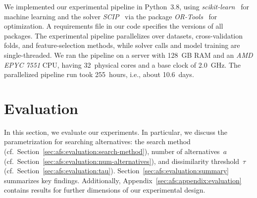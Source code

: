 \documentclass{article}
\theoremstyle{definition}
\begin{document}
We implemented our experimental pipeline in Python~3.8, using \emph{scikit-learn}~\cite{pedregosa2011scikit-learn} for machine learning and the solver \emph{SCIP}~\cite{bestuzheva2021scip} via the package \emph{OR-Tools}~\cite{perron2022or-tools} for optimization.
A requirements file in our code specifies the versions of all packages.
The experimental pipeline parallelizes over datasets, cross-validation folds, and feature-selection methods, while solver calls and model training are single-threaded.
We ran the pipeline on a server with 128~GB RAM and an \emph{AMD EPYC 7551} CPU, having 32~physical cores and a base clock of 2.0~GHz.
The parallelized pipeline run took 255~hours, i.e., about 10.6~days.

\section{Evaluation}
\label{sec:afs:evaluation}

In this section, we evaluate our experiments.
In particular, we discuss the parametrization for searching alternatives: the search method (cf.~Section~\ref{sec:afs:evaluation:search-method}), number of alternatives~$a$ (cf.~Section~\ref{sec:afs:evaluation:num-alternatives}), and dissimilarity threshold~$\tau$ (cf.~Section~\ref{sec:afs:evaluation:tau}).
Section~\ref{sec:afs:evaluation:summary} summarizes key findings.
Additionally, Appendix~\ref{sec:afs:appendix:evaluation} contains results for further dimensions of our experimental design.
\end{document}
